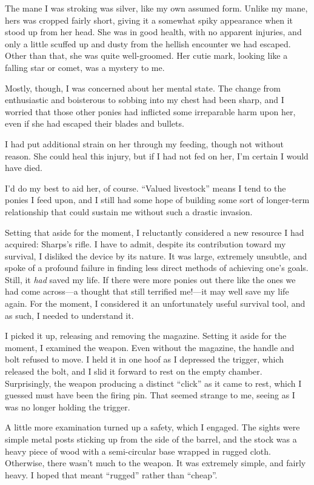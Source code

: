 The mane I was stroking was silver, like my own assumed form. Unlike my mane, hers was cropped fairly short, giving it a somewhat spiky appearance when it stood up from her head. She was in good health, with no apparent injuries, and only a little scuffed up and dusty from the hellish encounter we had escaped. Other than that, she was quite well-groomed. Her cutie mark, looking like a falling star or comet, was a mystery to me.

Mostly, though, I was concerned about her mental state. The change from enthusiastic and boisterous to sobbing into my chest had been sharp, and I worried that those other ponies had inflicted some irreparable harm upon her, even if she had escaped their blades and bullets.

I had put additional strain on her through my feeding, though not without reason. She could heal this injury, but if I had not fed on her, I’m certain I would have died.

I’d do my best to aid her, of course. “Valued livestock” means I tend to the ponies I feed upon, and I still had some hope of building some sort of longer-term relationship that could sustain me without such a drastic invasion.

Setting that aside for the moment, I reluctantly considered a new resource I had acquired: Sharps’s rifle. I have to admit, despite its contribution toward my survival, I disliked the device by its nature. It was large, extremely unsubtle, and spoke of a profound failure in finding less direct methods of achieving one’s goals. Still, it \textit{had} saved my life. If there were more ponies out there like the ones we had come across—a thought that still terrified me!—it may well save my life again. For the moment, I considered it an unfortunately useful survival tool, and as such, I needed to understand it.

I picked it up, releasing and removing the magazine. Setting it aside for the moment, I examined the weapon. Even without the magazine, the handle and bolt refused to move. I held it in one hoof as I depressed the trigger, which released the bolt, and I slid it forward to rest on the empty chamber. Surprisingly, the weapon producing a distinct “click” as it came to rest, which I guessed must have been the firing pin. That seemed strange to me, seeing as I was no longer holding the trigger.

A little more examination turned up a safety, which I engaged. The sights were simple metal posts sticking up from the side of the barrel, and the stock was a heavy piece of wood with a semi-circular base wrapped in rugged cloth. Otherwise, there wasn’t much to the weapon. It was extremely simple, and fairly heavy. I hoped that meant “rugged” rather than “cheap”.

